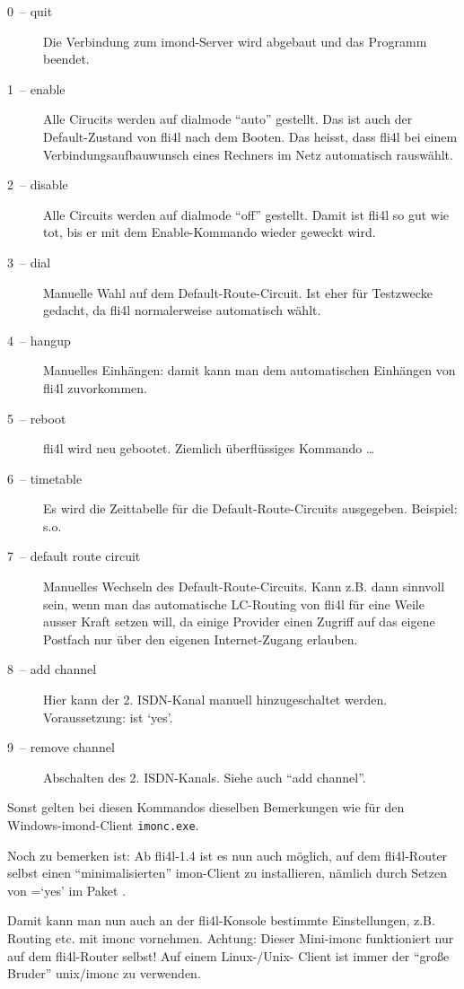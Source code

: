   \begin{description}
  \item[0~-- quit] Die Verbindung zum imond-Server wird abgebaut und
    das Programm beendet.


  \item[1~-- enable] Alle Cirucits werden auf dialmode ``auto''
    gestellt. Das ist auch der Default-Zustand von fli4l nach dem
    Booten. Das heisst, dass fli4l bei einem Verbindungsaufbauwunsch
    eines Rechners im Netz automatisch rauswählt.


  \item[2~-- disable] Alle Circuits werden auf dialmode ``off''
    gestellt. Damit ist fli4l so gut wie tot, bis er mit dem
    Enable-Kommando wieder geweckt wird.


  \item[3~-- dial] Manuelle Wahl auf dem Default-Route-Circuit. Ist
    eher für Testzwecke gedacht, da fli4l normalerweise automatisch
    wählt.


  \item[4~-- hangup] Manuelles Einhängen: damit kann man dem
    automatischen Einhängen von fli4l zuvorkommen.


  \item[5~-- reboot] fli4l wird neu gebootet. Ziemlich überflüssiges
    Kommando \ldots


  \item[6~-- timetable] Es wird die Zeittabelle für die
    Default-Route-Circuits ausgegeben.  Beispiel: s.o.


  \item[7~-- default route circuit] Manuelles Wechseln des
    Default-Route-Circuits. Kann z.B. dann sinnvoll sein, wenn man das
    automatische LC-Routing von fli4l für eine Weile ausser Kraft
    setzen will, da einige Provider einen Zugriff auf das eigene
    Postfach nur über den eigenen Internet-Zugang erlauben.


  \item[8~-- add channel] Hier kann der 2. ISDN-Kanal manuell
    hinzugeschaltet werden.  Voraussetzung:
    ist `yes'.


  \item[9~-- remove channel] Abschalten des 2. ISDN-Kanals. Siehe auch
    ``add channel''.

  \end{description}

  \noindent Sonst gelten bei diesen Kommandos dieselben Bemerkungen wie für den
  Windows-imond-Client \verb+imonc.exe+.

  Noch zu bemerken ist: Ab fli4l-1.4 ist es nun auch möglich, auf dem
  fli4l-Router selbst einen ``minimalisierten'' imon-Client zu
  installieren, nämlich durch Setzen von
  =`yes' im Paket
  .

  Damit kann man nun auch an der fli4l-Konsole bestimmte
  Einstellungen, z.B. Routing etc. mit imonc vornehmen. Achtung:
  Dieser Mini-imonc funktioniert nur auf dem fli4l-Router selbst! Auf
  einem Linux-/Unix- Client ist immer der ``große Bruder'' unix/imonc
  zu verwenden.
